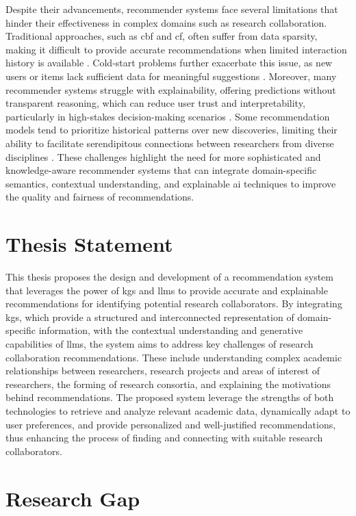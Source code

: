 Despite their advancements, recommender systems face several limitations that hinder their effectiveness in complex domains such as research collaboration.
Traditional approaches, such as \gls{cbf} and \gls{cf}, often suffer from data sparsity, making it difficult to provide accurate recommendations when limited interaction history is available \cite{Plexousakis2005, WEI201729}.
Cold-start problems further exacerbate this issue, as new users or items lack sufficient data for meaningful suggestions \cite{Lu2012}.
Moreover, many recommender systems struggle with explainability, offering predictions without transparent reasoning, which can reduce user trust and interpretability, particularly in high-stakes decision-making scenarios \cite{AIinRecSys}.
Some recommendation models tend to prioritize historical patterns over new discoveries, limiting their ability to facilitate serendipitous connections between researchers from diverse disciplines \cite{Jagadishwari2023,Iana2021}.
These challenges highlight the need for more sophisticated and knowledge-aware recommender systems that can integrate domain-specific semantics, contextual understanding, and explainable \gls{ai} techniques to improve the quality and fairness of recommendations.
%
\section{Thesis Statement}\label{sec:thesis-statement}

This thesis proposes the design and development of a recommendation system that leverages the power of \glspl{kg} and \glspl{llm} to provide accurate and explainable recommendations for identifying potential research collaborators.
By integrating \glspl{kg}, which provide a structured and interconnected representation of domain-specific information, with the contextual understanding and generative capabilities of \glspl{llm}, the system aims to address key challenges of research collaboration recommendations.
These include understanding complex academic relationships between researchers, research projects and areas of interest of researchers, the forming of research consortia, and explaining the motivations behind recommendations.
The proposed system leverage the strengths of both technologies to retrieve and analyze relevant academic data, dynamically adapt to user preferences, and provide personalized and well-justified recommendations, thus enhancing the process of finding and connecting with suitable research collaborators.
%
\section{Research Gap}\label{sec:research-gap}

%
